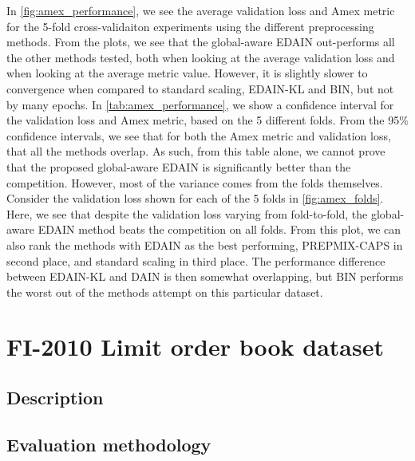 \documentclass{statsmsc}
\begin{document}
{In \cref{fig:amex_performance}, we see the average validation loss and Amex metric for the
5-fold cross-validaiton experiments using the different preprocessing methods. From the plots,
we see that the global-aware \ac{EDAIN} out-performs all the other methods tested, both
when looking at the average validation loss and when looking at the average metric value.
However, it is slightly slower to convergence when compared to standard scaling,
\ac{EDAIN-KL} and \ac{BIN}, but not by many epochs.
In \cref{tab:amex_performance}, we show a confidence interval for the validation loss and Amex
metric, based on the 5 different folds. From the 95\% confidence intervals, we see that for both
the Amex metric and validation loss, that all the methods overlap. As such, from this table
alone, we cannot prove that the proposed global-aware \ac{EDAIN} is significantly better than
the competition. However, most of the variance comes from the folds themselves. Consider the
validation loss shown for each of the 5 folds in \cref{fig:amex_folds}. Here, we see that despite
the validation loss varying from fold-to-fold, the global-aware \ac{EDAIN} method beats the
competition on all folds. From this plot, we can also rank the methods with \ac{EDAIN} as the
best performing, \ac{PREPMIX-CAPS} in second place, and standard scaling in third place.
The performance difference between \ac{EDAIN-KL} and \ac{DAIN} is then somewhat overlapping,
but \ac{BIN} performs the worst out of the methods attempt on this particular dataset.



\section{FI-2010 Limit order book dataset}%
\label{sec:American Express default prediction dataset}%

\subsection{Description}%
\label{sub:Description}


\subsection{Evaluation methodology}%
\label{sec:lob_meth}

}
\end{document}
